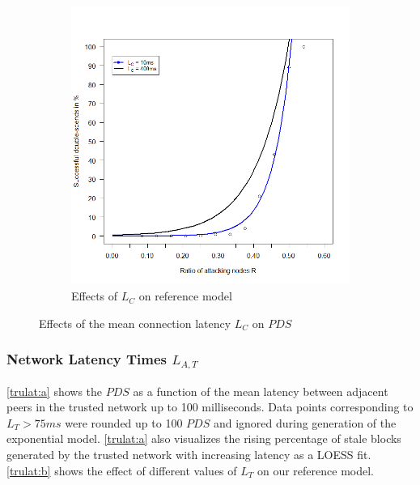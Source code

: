 \documentclass[a4paper,12pt,twoside]{report}
\begin{document}
\begin{figure}
\begin{subfigure}{.5\textwidth}
  \includegraphics[width=\linewidth]{Experiments/ConnLatency/conrat.png}
  \caption{Effects of $L_{C}$ on reference model}
  \label{conn:b}
\end{subfigure}
\caption{Effects of the mean connection latency $L_{C}$ on $PDS$}
\label{conn}
\end{figure}

\subsubsection{Network Latency Times $L_{A,T}$}
\autoref{trulat:a} shows the $PDS$ as a function of the mean latency between adjacent peers in the trusted network up to 100 milliseconds. Data points corresponding to $L_T > 75ms$ were rounded up to 100 $PDS$ and ignored during generation of the exponential model. \autoref{trulat:a} also visualizes the rising percentage of stale blocks generated by the trusted network with increasing latency as a LOESS fit. \autoref{trulat:b} shows the effect of different values of $L_T$ on our reference model.
\end{document}
